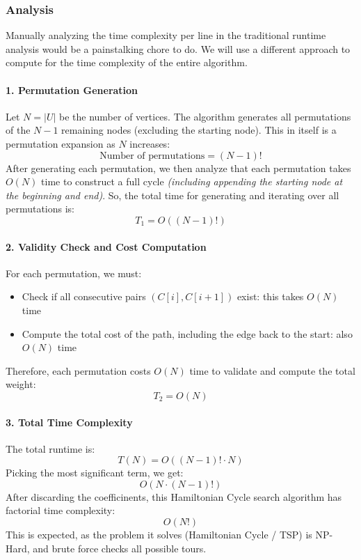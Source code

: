 \subsubsection{Analysis}

Manually analyzing the time complexity per line in the traditional runtime analysis would be a painstalking chore to do. We will use a different approach to compute for the time complexity of the entire algorithm.

\paragraph{1. Permutation Generation} 

Let \( N = |U| \) be the number of vertices. The algorithm generates all permutations of the \( N - 1 \) remaining nodes (excluding the starting node). This in itself is a permutation expansion as $N$ increases:
\[
\text{Number of permutations} = (N - 1)!
\]
After generating each permutation, we then analyze that each permutation takes \( O(N) \) time to construct a full cycle \textit{(including appending the starting node at the beginning and end)}. So, the total time for generating and iterating over all permutations is:
\[
T_1 = O((N - 1)!)
\]
\paragraph{2. Validity Check and Cost Computation}

For each permutation, we must:

\begin{itemize}
    \item Check if all consecutive pairs \( (C[i], C[i+1]) \) exist: this takes \( O(N) \) time
    \item Compute the total cost of the path, including the edge back to the start: also \( O(N) \) time
\end{itemize}

Therefore, each permutation costs \( O(N) \) time to validate and compute the total weight:
\[
T_2 = O(N)
\]

\paragraph{3. Total Time Complexity}

The total runtime is:
\[
    T(N) = O((N - 1)! \cdot N)
\]
Picking the most significant term, we get:
\[
    O(N \cdot (N - 1)!)
\]
After discarding the coefficinents, this Hamiltonian Cycle search algorithm has factorial time complexity:
\[
\boxed{O(N!)}
\]
This is expected, as the problem it solves (Hamiltonian Cycle / TSP) is NP-Hard, and brute force checks all possible tours.
